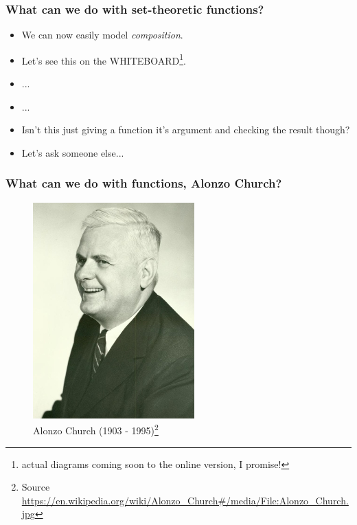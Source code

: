 \documentclass
  [hyperref={colorlinks = true,linkcolor = blue, 
             citecolor = blue, urlcolor = blue}
  ]{beamer}
\begin{document}
\begin{frame}[fragile]
\frametitle{What can we do with set-theoretic functions?}
  \begin{itemize}
    \item<1-> We can now easily model \textit{composition}.
    \item<2-> Let's see this on the
    WHITEBOARD\footnote<2->{actual diagrams coming soon to the 
    online version, I promise!}.
    \item<3-> ...
    \item<4-> ...
    \item<5-> Isn't this just giving a function it's argument
              and checking the result though?
    \item<6-> Let's ask someone else...
  \end{itemize}
\end{frame}

\end{document}
